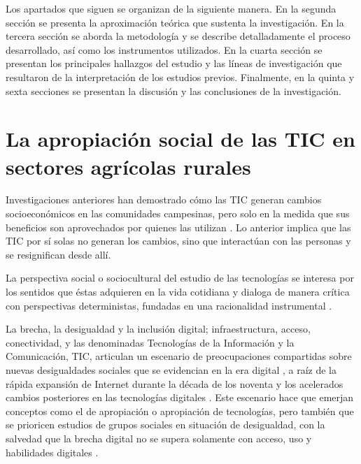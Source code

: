 \documentclass[spanish]{textolivre}
\begin{document}
Los apartados que siguen se organizan de la siguiente manera. En la segunda sección se presenta la aproximación teórica que sustenta la investigación. En la tercera sección se aborda la metodología y se describe detalladamente el proceso desarrollado, así como los instrumentos utilizados. En la cuarta sección se presentan los principales hallazgos del estudio y las líneas de investigación que resultaron de la interpretación de los estudios previos. Finalmente, en la quinta y sexta secciones se presentan la discusión y las conclusiones de la investigación.

\section{La apropiación social de las TIC en sectores agrícolas rurales}

Investigaciones anteriores han demostrado cómo las TIC generan cambios socioeconómicos en las comunidades campesinas, pero solo en la medida que sus beneficios son aprovechados por quienes las utilizan \cite{sanchez_davila_nuevas_2018,zapata_-_cardenas_ruralidad_2015,castro_hidalgo_impacto_2014,barbosa_trigos_propuesta_2016,santini_uso_2017}. Lo anterior implica que las TIC por sí solas no generan los cambios, sino que interactúan con las personas y se resignifican desde allí.

La perspectiva social o sociocultural \cite{sandoval_algunos_2017} del estudio de las tecnologías se interesa por los sentidos que éstas adquieren en la vida cotidiana y dialoga de manera crítica con perspectivas deterministas, fundadas en una racionalidad instrumental \cite{lopez_apropiarse_2017}.

La brecha, la desigualdad y la inclusión digital; infraestructura, acceso, conectividad, y las denominadas Tecnologías de la Información y la Comunicación, TIC, articulan un escenario de preocupaciones compartidas sobre nuevas desigualdades sociales que se evidencian en la era digital \cite{rivoir_reflexiones_2017}, a raíz de la rápida expansión de Internet durante la década de los noventa y los acelerados cambios posteriores en las tecnologías digitales \cite{lago_martinez_teori_2017}. Este escenario hace que emerjan conceptos como el de apropiación o apropiación de tecnologías, pero también que se prioricen estudios de grupos sociales en situación de desigualdad, con la salvedad que la brecha digital no se supera solamente con acceso, uso y habilidades digitales \cite{lago_martinez_teori_2017}.
\end{document}
